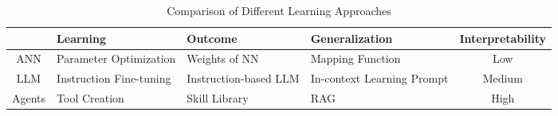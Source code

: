 \begin{table}
\label{tab:learning_approaches}
\begin{tabularx}{\textwidth}{|c|>{\centering\arraybackslash}m{3cm}|>{\centering\arraybackslash}m{4cm}|>{\centering\arraybackslash}m{4cm}|c|}
\hline
 & \textbf{Learning} & \textbf{Outcome} & \textbf{Generalization} & \textbf{Interpretability} \\ \hline
ANN & Parameter Optimization & Weights of NN & Mapping Function & Low \\ \hline
LLM & Instruction Fine-tuning & Instruction-based LLM & In-context Learning Prompt & Medium \\ \hline
Agents & Tool Creation & Skill Library & RAG & High \\ \hline
\end{tabularx}
\centering
\vspace{2mm} %
\caption{Comparison of Different Learning Approaches}
\end{table}
